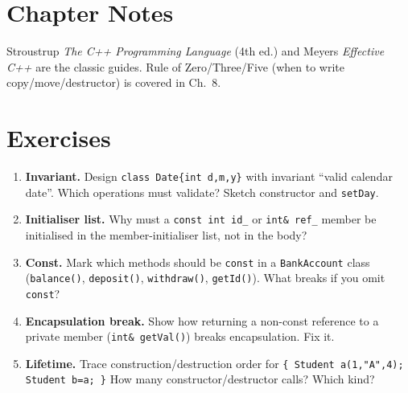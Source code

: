 \section{Chapter Notes}
Stroustrup \emph{The C++ Programming Language} (4th ed.) and Meyers \emph{Effective C++} are the classic guides. Rule of Zero/Three/Five (when to write copy/move/destructor) is covered in Ch.~8.

\section{Exercises}
\begin{enumerate}[label=E5.\arabic*, leftmargin=*, itemsep=0.6em]
\item \textbf{Invariant.} Design \texttt{class Date\{int d,m,y\}} with invariant ``valid calendar date''. Which operations must validate? Sketch constructor and \texttt{setDay}.
\item \textbf{Initialiser list.} Why must a \texttt{const int id\_} or \texttt{int\& ref\_} member be initialised in the member-initialiser list, not in the body?
\item \textbf{Const.} Mark which methods should be \texttt{const} in a \texttt{BankAccount} class (\texttt{balance()}, \texttt{deposit()}, \texttt{withdraw()}, \texttt{getId()}). What breaks if you omit \texttt{const}?
\item \textbf{Encapsulation break.} Show how returning a non-const reference to a private member (\texttt{int\& getVal()}) breaks encapsulation. Fix it.
\item \textbf{Lifetime.} Trace construction/destruction order for \texttt{\{ Student a(1,"A",4); Student b=a; \}} How many constructor/destructor calls? Which kind?
\end{enumerate}
